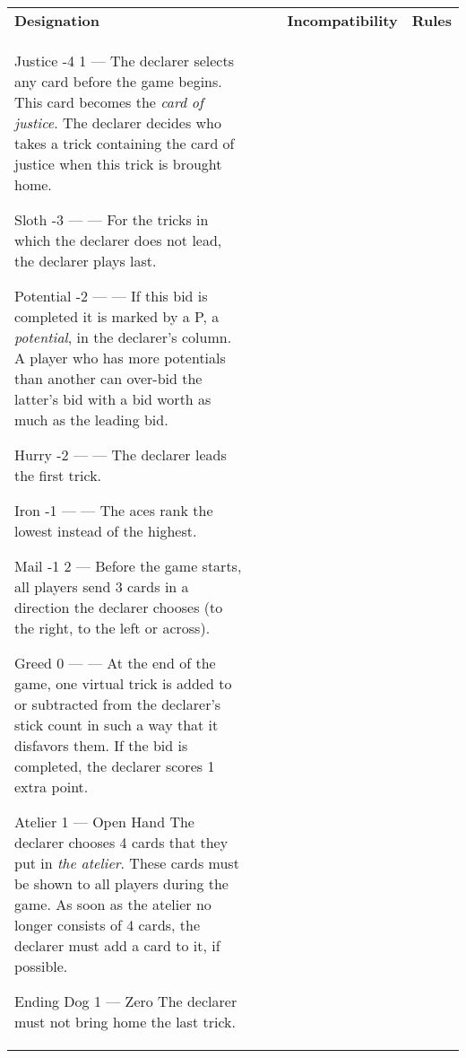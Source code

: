 	\begin{center}
		\begin{tabularx}{\textwidth}{
				l
				S[table-number-alignment=center, table-format=1.0]
				S[table-number-alignment=center, table-format=1.0]
				p{3cm}
				|X
			}

			\textbf{Designation} &
			 &
			 &
			\textbf{Incompatibility} &
			\textbf{Rules}
			\\[-3ex]

			\specialBidItem%
			{Justice}
			{-4}
			{1}
			{---}
			{%
				The declarer selects any card before the game begins. This card becomes the \emph{card of justice}. The declarer decides who takes a trick containing the card of justice when this trick is brought home.
			}

			\specialBidItem%
			{Sloth}
			{-3}
			{{---}}
			{---}
			{%
				For the tricks in which the declarer does not lead, the declarer plays last.
			}

			\specialBidItem%
			{Potential}
			{-2}
			{{---}}
			{---}
			{%
				If this bid is completed it is marked by a P, a \emph{potential}, in the declarer's column. A player who has more potentials than another can over-bid the latter's bid with a bid worth as much as the leading bid.
			}

			\specialBidItem%
			{Hurry}
			{-2}
			{{---}}
			{---}
			{%
				The declarer leads the first trick.
			}

			\specialBidItem%
			{Iron}
			{-1}
			{{---}}
			{---}
			{%
				The aces rank the lowest instead of the highest.
			}

			\specialBidItem%
			{Mail}
			{-1}
			{2}
			{---}
			{%
				Before the game starts, all players send 3 cards in a direction the declarer chooses (to the right, to the left or across).
			}

			\specialBidItem%
			{Greed}
			{0}
			{{---}}
			{---}
			{%
				At the end of the game, one virtual trick is added to or subtracted from the declarer's stick count in such a way that it disfavors them. If the bid is completed, the declarer scores 1 extra point.
			}

			\specialBidItem%
			{Atelier}
			{1}
			{{---}}
			{Open Hand}
			{%
				The declarer chooses 4 cards that they put in \emph{the atelier}. These cards must be shown to all players during the game. As soon as the atelier no longer consists of 4 cards, the declarer must add a card to it, if possible.
			}

			\specialBidItem%
			{Ending Dog}
			{1}
			{{---}}
			{Zero}
			{%
				The declarer must not bring home the last trick.
			}


\end{tabularx}
\end{center}
